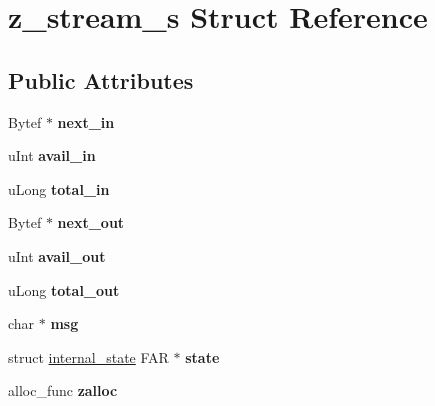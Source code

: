 \hypertarget{structz__stream__s}{}\section{z\+\_\+stream\+\_\+s Struct Reference}
\label{structz__stream__s}
\subsection*{Public Attributes}
\begin{DoxyCompactItemize}
\item 
\mbox{\label{structz__stream__s_a21d2c026f0f2fcd67f33011231f8ed00}} 
Bytef $\ast$ {\bfseries next\+\_\+in}
\item 
\mbox{\label{structz__stream__s_a0cf177f50dbb49692f27480cbcfde794}} 
u\+Int {\bfseries avail\+\_\+in}
\item 
\mbox{\label{structz__stream__s_aa8f408b9632737dc21519fa1ed34b08d}} 
u\+Long {\bfseries total\+\_\+in}
\item 
\mbox{\label{structz__stream__s_aed4a02cfe93e975314fed50b04427bf3}} 
Bytef $\ast$ {\bfseries next\+\_\+out}
\item 
\mbox{\label{structz__stream__s_a45ad2364307af9d944fd39d4eca3ca3c}} 
u\+Int {\bfseries avail\+\_\+out}
\item 
\mbox{\label{structz__stream__s_abae26f1f236cf920250b9d37fdf009c1}} 
u\+Long {\bfseries total\+\_\+out}
\item 
\mbox{\label{structz__stream__s_a9b2f745fc780e3b33e2935f8c650a326}} 
char $\ast$ {\bfseries msg}
\item 
\mbox{\label{structz__stream__s_ac4a114217a1868dc6fbe7d1f5bda126b}} 
struct \hyperlink{structinternal__state}{internal\+\_\+state} F\+AR $\ast$ {\bfseries state}
\item 
\mbox{\label{structz__stream__s_a23a2299c384f808e76e9908f21216b0f}} 
alloc\+\_\+func {\bfseries zalloc}
\item 

\end{DoxyCompactItemize}
